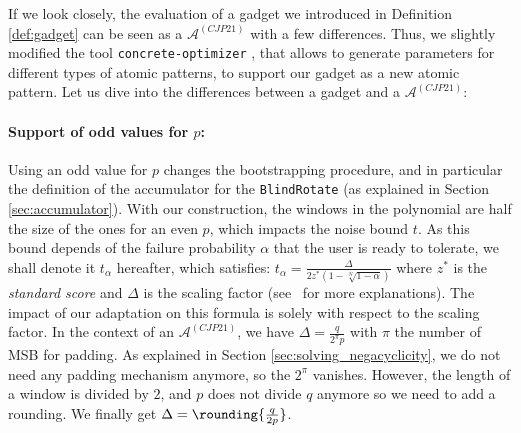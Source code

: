 If we look closely, the evaluation of a gadget we introduced in Definition \ref{def:gadget} can be seen as a $\mathcal{A}^{(CJP21)}$ with a few differences. Thus, we slightly modified the tool \texttt{concrete-optimizer} \cite{concrete-optimizer}, that allows to generate parameters for different types of atomic patterns, to support our gadget as a new atomic pattern. Let us dive into the differences between a gadget and a $\mathcal{A}^{(CJP21)}$:

\paragraph{Support of odd values for $p$:} Using an odd value for $p$ changes the bootstrapping procedure, and in particular the definition of the accumulator for the \texttt{BlindRotate} (as explained in Section \ref{sec:accumulator}). With our construction, the windows in the polynomial are half the size of the ones for an even $p$, which impacts the noise bound $t$. 
As this bound depends of the failure probability $\alpha$ that the user is ready to tolerate, we shall denote it $t_\alpha$ hereafter, which satisfies: $t_\alpha = \frac{\Delta}{2z^*(1-\sqrt[N]{1-\alpha})}$
where $z^*$ is the \emph{standard score} and $\Delta$ is the scaling factor (see~\cite{zama_parameters_optimization} for more explanations). The impact of our adaptation on this formula is solely with respect to the scaling factor. In the context of an $\mathcal{A}^{(CJP21)}$, we have $\Delta = \frac{q}{2^\pi p}$ with $\pi$ the number of MSB for padding. As explained in Section \ref{sec:solving_negacyclicity}, we do not need any padding mechanism anymore, so the $2^\pi$ vanishes. However, the length of a window is divided by $2$, and $p$ does not divide $q$ anymore so we need to add a rounding. We finally get $\Delta = \rounding{\frac{q}{2p}}$.


